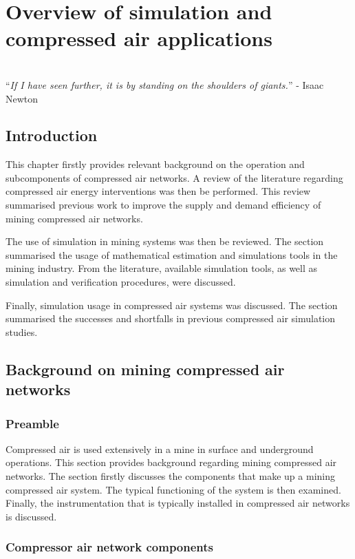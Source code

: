 \chapter{Overview of simulation and compressed air applications}
\label{Chap2}
\thispagestyle{empty}
\vspace{38em}
\hrulefill
\\
\enquote{\textit{If I have seen further, it is by standing on the shoulders of giants.}} - Isaac Newton\\
\clearpage
\section{Introduction}
 This chapter firstly provides relevant background on the operation and subcomponents of compressed air networks. A review of the literature regarding compressed air energy interventions was then be performed. This review summarised previous work to improve the supply and demand efficiency of mining compressed air networks.
\par
The use of simulation in mining systems was then be reviewed. The section summarised the usage of mathematical estimation and simulations tools in the mining industry.  From the literature, available simulation tools, as well as simulation and verification procedures, were discussed.
\par
Finally, simulation usage in compressed air systems was discussed. The section summarised the successes and shortfalls in previous compressed air simulation studies.
\section{Background on mining compressed air networks}
\subsection{Preamble}
Compressed air is used extensively in a mine in surface and underground operations. This section provides background regarding mining compressed air networks. The section firstly discusses the components that make up a mining compressed air system. The typical functioning of the system is then examined. Finally, the instrumentation that is typically installed in compressed air networks is discussed.
\subsection{Compressor air network components}
